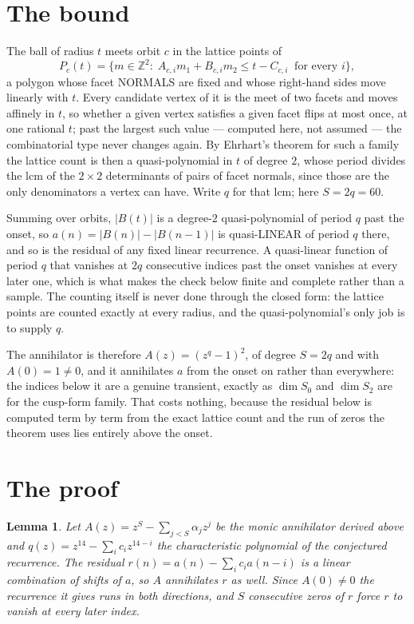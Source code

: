 \documentclass[11pt,a4paper]{article}
\theoremstyle{plain}
\newtheorem{lemma}[theorem]{Lemma}
\theoremstyle{definition}
\begin{document}
\section{The bound}

The ball of radius $t$ meets orbit $c$ in the lattice points of
\[
P_c(t)=\{m\in\mathbb{Z}^2:\;A_{c,i}m_1+B_{c,i}m_2\le t-C_{c,i}\ \text{ for every } i\},
\]
a polygon whose facet NORMALS are fixed and whose right-hand sides move linearly with $t$.
Every candidate vertex of it is the meet of two facets and moves affinely in $t$, so whether a
given vertex satisfies a given facet flips at most once, at one rational $t$; past the largest
such value --- computed here, not assumed --- the combinatorial type never changes again. By
Ehrhart's theorem for such a family the lattice count is then a quasi-polynomial in $t$ of
degree $2$, whose period divides the lcm of the $2\times2$ determinants of pairs of facet
normals, since those are the only denominators a vertex can have. Write $q$ for that lcm;
here $S=2q=60$.

Summing over orbits, $|B(t)|$ is a degree-$2$ quasi-polynomial of period $q$ past the onset,
so $a(n)=|B(n)|-|B(n-1)|$ is quasi-LINEAR of period $q$ there, and so is the residual of any
fixed linear recurrence. A quasi-linear function of period $q$ that vanishes at $2q$
consecutive indices past the onset vanishes at every later one, which is what makes the check
below finite and complete rather than a sample. The counting itself is never done through the
closed form: the lattice points are counted exactly at every radius, and the quasi-polynomial's
only job is to supply $q$.

The annihilator is therefore $A(z)=(z^{q}-1)^2$, of degree $S=2q$ and with $A(0)=1\ne0$, and
it annihilates $a$ from the onset on rather than everywhere: the indices below it are a
genuine transient, exactly as $\dim S_0$ and $\dim S_2$ are for the cusp-form family. That
costs nothing, because the residual below is computed term by term from the exact lattice
count and the run of zeros the theorem uses lies entirely above the onset.

\section{The proof}

\begin{lemma}\label{lem:crit}
Let $A(z)=z^S-\sum_{j<S}\alpha_jz^{j}$ be the monic annihilator derived above and
$q(z)=z^{14}-\sum_ic_iz^{14-i}$ the characteristic polynomial of the conjectured
recurrence. The residual $r(n)=a(n)-\sum_ic_ia(n-i)$ is a linear combination of shifts of $a$,
so $A$ annihilates $r$ as well. Since $A(0)\ne0$ the recurrence it gives runs in both
directions, and $S$ consecutive zeros of $r$ force $r$ to vanish at every later index.
\end{lemma}
\end{document}
